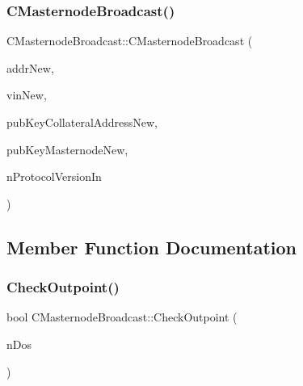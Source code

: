 \subsubsection{\texorpdfstring{C\+Masternode\+Broadcast()}{CMasternodeBroadcast()}\hspace{0.1cm}{\footnotesize\ttfamily [3/3]}}
{\footnotesize\ttfamily C\+Masternode\+Broadcast\+::\+C\+Masternode\+Broadcast (\begin{DoxyParamCaption}\item[{\mbox{\hyperlink{class_c_service}{C\+Service}}}]{addr\+New,  }\item[{C\+Tx\+In}]{vin\+New,  }\item[{\mbox{\hyperlink{class_c_pub_key}{C\+Pub\+Key}}}]{pub\+Key\+Collateral\+Address\+New,  }\item[{\mbox{\hyperlink{class_c_pub_key}{C\+Pub\+Key}}}]{pub\+Key\+Masternode\+New,  }\item[{int}]{n\+Protocol\+Version\+In }\end{DoxyParamCaption})\hspace{0.3cm}{\ttfamily [inline]}}



\subsection{Member Function Documentation}
\mbox{\label{class_c_masternode_broadcast_ad3e6be4a6f0206e5d8e6dcb427d169ce}} 
\subsubsection{\texorpdfstring{Check\+Outpoint()}{CheckOutpoint()}}
{\footnotesize\ttfamily bool C\+Masternode\+Broadcast\+::\+Check\+Outpoint (\begin{DoxyParamCaption}\item[{int \&}]{n\+Dos }\end{DoxyParamCaption})}

\mbox{\label{class_c_masternode_broadcast_a12769e5247ac34008e887ba6bb04496a}} 
